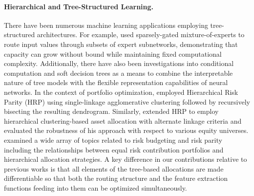 \documentclass{article}
\begin{document}
\paragraph{Hierarchical and Tree-Structured Learning.} There have been numerous machine learning applications employing tree-structured architectures. For example, \citet{Shazeer2017} used sparsely-gated mixture-of-experts to route input values through subsets of expert subnetworks, demonstrating that capacity can grow without bound while maintaining fixed computational complexity. Additionally, there have also been investigations into conditional computation and soft decision trees as a means to combine the interpretable nature of tree models with the flexible representation capabilities of neural networks. In the context of portfolio optimization, \citet{LopezdePrado2016} employed Hierarchical Risk Parity (HRP) using single-linkage agglomerative clustering followed by recursively bisecting the resulting dendrogram. Similarly, \citet{Raffinot2018} extended HRP to employ hierarchical clustering-based asset allocation with alternate linkage criteria and evaluated the robustness of his approach with respect to various equity universes. \citet{Roncalli2013} examined a wide array of topics related to risk budgeting and risk parity including the relationships between equal risk contribution portfolios and hierarchical allocation strategies. A key difference in our contributions relative to previous works is that all elements of the tree-based allocations are made differentiable so that both the routing structure and the feature extraction functions feeding into them can be optimized simultaneously.
\end{document}
